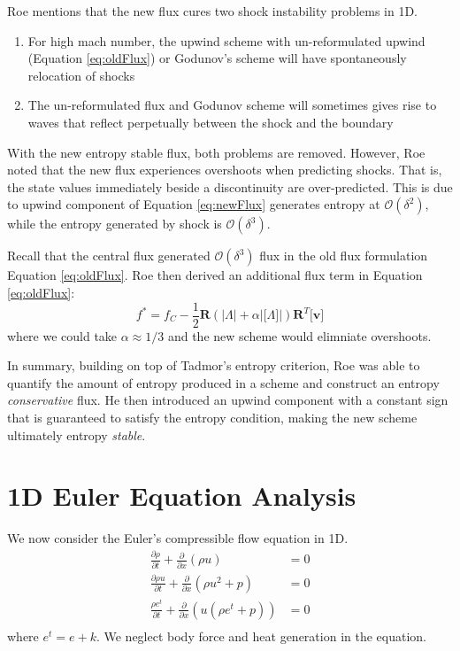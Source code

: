 \documentclass[a4paper]{article}
\numberwithin{equation}{section}
\begin{document}
Roe mentions that the new flux cures two shock instability problems in 1D.
\begin{enumerate}
    \item For high mach number, the upwind scheme with un-reformulated upwind (Equation \ref{eq:oldFlux}) or Godunov's scheme will have spontaneously relocation of shocks
    \item The un-reformulated flux and Godunov scheme will sometimes gives rise to waves that reflect perpetually between the shock and the boundary
\end{enumerate}
With the new entropy stable flux, both problems are removed. However, Roe noted that the new flux experiences overshoots when predicting shocks. That is, the state values immediately beside a discontinuity are over-predicted. This is due to upwind component of Equation \ref{eq:newFlux} generates entropy at $\mathcal{O}(\delta^2)$, while the entropy generated by shock is $\mathcal{O}(\delta^3)$. 

Recall that the central flux generated $\mathcal{O}(\delta^3)$ flux in the old flux formulation Equation \ref{eq:oldFlux}. Roe then derived an additional flux term in Equation \ref{eq:oldFlux}:
\begin{equation}
    f^* = f_C - \frac{1}{2}\mathbf{R}(\left|\Lambda \right| + \alpha \left| \big[\Lambda\big] \right|) \mathbf{R}^T \big[\mathbf{v}\big]
\end{equation}
where we could take $\alpha \approx 1/3$ and the new scheme would elimniate overshoots.

In summary, building on top of Tadmor's entropy criterion, Roe was able to quantify the amount of entropy produced in a scheme and construct an entropy \textit{conservative} flux. He then introduced an upwind component with a constant sign that is guaranteed to satisfy the entropy condition, making the new scheme ultimately entropy \textit{stable}.
\clearpage
\section{1D Euler Equation Analysis}
We now consider the Euler's compressible flow equation in 1D. 
\begin{equation}
    \begin{split}
        \frac{\partial \rho}{\partial t} + \frac{\partial}{\partial x}(\rho u) &= 0\\
        \frac{\partial \rho u}{\partial t} + \frac{\partial}{\partial x}(\rho u^2 + p)& = 0\\
        \frac{\rho e^t}{\partial t} + \frac{\partial}{\partial x}(u(\rho e^t + p))& = 0\\
    \end{split}
\end{equation}
where $e^t = e + k$. We neglect body force and heat generation in the equation.
\end{document}
